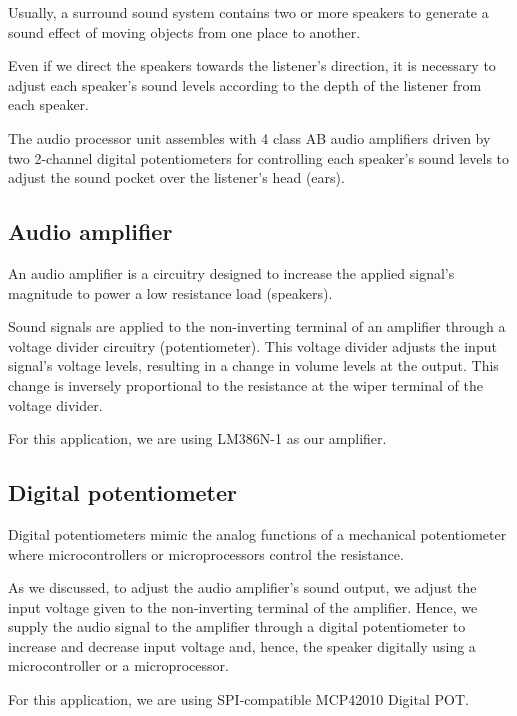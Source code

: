 \documentclass[../block_diagram_intro/block_diagram_intro.tex]{subfiles}
\begin{document}
Usually, a surround sound system contains two or more speakers to generate a sound 
effect of moving objects from one place to another.

Even if we direct the speakers towards the listener's direction, it is necessary to 
adjust each speaker's sound levels according to the depth of the listener from each 
speaker.

The audio processor unit assembles with 4 class AB audio amplifiers driven by two 
2-channel digital potentiometers for controlling each speaker's sound levels to adjust 
the sound pocket over the listener's head (ears).

\subsection{Audio amplifier}

An audio amplifier is a circuitry designed to increase the applied signal's magnitude 
to power a low resistance load (speakers).

Sound signals are applied to the non-inverting terminal of an amplifier through a 
voltage divider circuitry (potentiometer). This voltage divider adjusts the input 
signal's voltage levels, resulting in a change in volume levels at the output. This 
change is inversely proportional to the resistance at the wiper terminal of the voltage 
divider.

For this application, we are using LM386N-1 as our amplifier.

\subsection{Digital potentiometer}

Digital potentiometers mimic the analog functions of a mechanical potentiometer where 
microcontrollers or microprocessors control the resistance.

As we discussed, to adjust the audio amplifier's sound output, we adjust the input 
voltage given to the non-inverting terminal of the amplifier. Hence, we supply the 
audio signal to the amplifier through a digital potentiometer to increase and decrease 
input voltage and, hence, the speaker digitally using a microcontroller or a 
microprocessor.

For this application, we are using SPI-compatible MCP42010 Digital POT.
\end{document}
